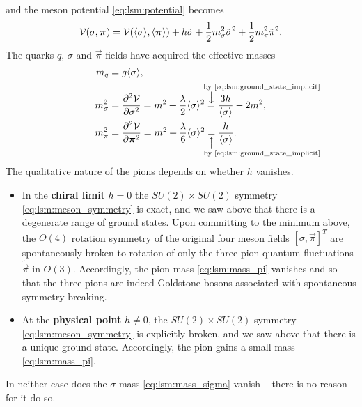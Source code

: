 and the meson potential \eqref{eq:lsm:potential} becomes
\begin{equation}
	\mathcal{V}(\sigma,{\bm{\pi}}) = \mathcal{V}(\langle \sigma \rangle,\langle {\bm{\pi}} \rangle) + h \tilde{\sigma} + \frac12 m_\sigma^2 \tilde{\sigma}^2 + \frac12 m_\pi^2 \tilde{\pi}^2.
\end{equation}
The quarks $q$, $\sigma$ and $\vec\pi$ fields have acquired the effective masses
\begin{subequations}
\begin{align}
	m_q &= g \avg{\sigma}, \label{eq:lsm:mass_quark} \\
	m_\sigma^2 &= \pdv[2]{\pot}{\sigma}\iffalse_{\substack{\sigma=\avg{\sigma}\\\vec{\pi}=\avg{\vec{\pi}}}}\fi    = m^2 + \frac{\lambda}{2} \avg{\sigma}^2 \equalexplabove{\text{by \eqref{eq:lsm:ground_state_implicit}}} \frac{3h}{\avg{\sigma}} - 2 m^2 , \label{eq:lsm:mass_sigma} \\
	m_\pi^2    &= \pdv[2]{\pot}{\vec{\pi}}\iffalse_{\substack{\sigma=\avg{\sigma}\\\vec{\pi}=\avg{\vec{\pi}}}}\fi = m^2 + \frac{\lambda}{6} \avg{\sigma}^2 \equalexplbelow{\text{by \eqref{eq:lsm:ground_state_implicit}}} \frac{h}{\avg{\sigma}} . \label{eq:lsm:mass_pi}
\end{align}%
\label{eq:lsm:mass_sigmapi}%
\end{subequations}%
The qualitative nature of the pions depends on whether $h$ vanishes.
\begin{itemize}
\item In the \textbf{chiral limit} $h = 0$ the $SU(2) \times SU(2)$ symmetry \eqref{eq:lsm:meson_symmetry} is exact,
      and we saw above that there is a degenerate range of ground states.
      Upon committing to the minimum above, the $O(4)$ rotation symmetry of the original four meson fields $[\sigma,\vec\pi]^T$ are spontaneously broken
      to rotation of only the three pion quantum fluctuations $\tilde{\vec\pi}$ in $O(3)$.
      Accordingly, the pion mass \eqref{eq:lsm:mass_pi} vanishes and so that the three pions are indeed Goldstone bosons associated with spontaneous symmetry breaking.
\item At the \textbf{physical point} $h \neq 0$, the $SU(2) \times SU(2)$ symmetry \eqref{eq:lsm:meson_symmetry} is explicitly broken,
      and we saw above that there is a unique ground state.
      Accordingly, the pion gains a small mass \eqref{eq:lsm:mass_pi}.
\end{itemize}
\label{elaborate on mexican hat analogy, brim, tip/tilt, etc.}
In neither case does the $\sigma$ mass \eqref{eq:lsm:mass_sigma} vanish -- there is no reason for it do so.

